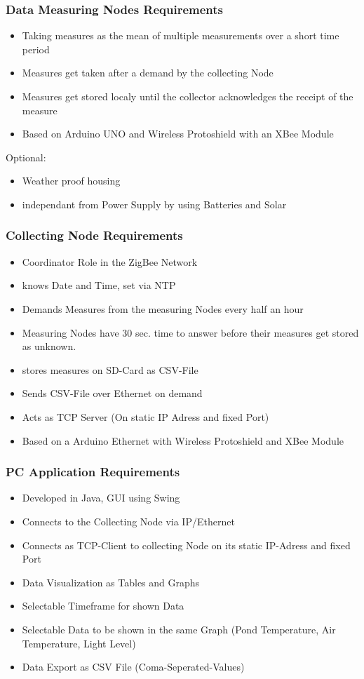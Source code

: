 \documentclass[
	11pt,
	a4paper
]{article}%
\begin{document}
\subsubsection{Data Measuring Nodes Requirements}
\begin{itemize}
\item Taking measures as the mean of multiple measurements over a short time period
\item Measures get taken after a demand by the collecting Node
\item Measures get stored localy until the collector acknowledges the receipt of the measure
\item Based on Arduino UNO and Wireless Protoshield with an XBee Module
\end{itemize}

Optional:
\begin{itemize}
\item Weather proof housing
\item independant from Power Supply by using Batteries and Solar
\end{itemize}

\subsubsection{Collecting Node Requirements}
\begin{itemize}
\item Coordinator Role in the ZigBee Network
\item knows Date and Time, set via NTP
\item Demands Measures from the measuring Nodes every half an hour
\item Measuring Nodes have 30 sec. time to answer before their measures get stored as unknown.
\item stores measures on SD-Card as CSV-File
\item Sends CSV-File over Ethernet on demand
\item Acts as TCP Server (On static IP Adress and fixed Port)
\item Based on a Arduino Ethernet with Wireless Protoshield and XBee Module
\end{itemize}

\subsubsection{PC Application Requirements}
\begin{itemize}
\item Developed in Java, GUI using Swing
\item Connects to the Collecting Node via IP/Ethernet
\item Connects as TCP-Client to collecting Node on its static IP-Adress and fixed Port
\item Data Visualization as Tables and Graphs
\item Selectable Timeframe for shown Data
\item Selectable Data to be shown in the same Graph (Pond Temperature, Air Temperature, Light Level)
\item Data Export as CSV File (Coma-Seperated-Values)
\end{itemize}
\end{document}
